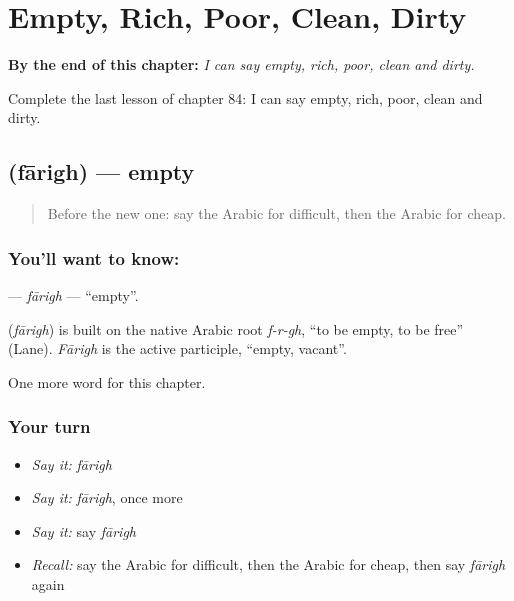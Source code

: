 
\chapter{Empty, Rich, Poor, Clean, Dirty}
\label{ch:ar-empty-rich-poor-clean-dirty}

\begin{chapteropening}
\textbf{By the end of this chapter:} \emph{I can say empty, rich, poor, clean and dirty.}

Complete the last lesson of chapter 84: I can say empty, rich, poor, clean and dirty.
\end{chapteropening}

\section[\texorpdfstring{\ar{فارغ} (fārigh)}{فارغ (fārigh)}]{ (fārigh) — empty}

\label{lesson:AR-C84-farigh}



\begin{quote}
Before the new one: say the Arabic for difficult, then the Arabic for cheap.
\end{quote}

\subsection*{You'll want to know: }
\textbf{} — \emph{fārigh} — \textquotedblleft{}empty\textquotedblright{}.

\begin{cousinweb}
\textbf{} (\emph{fārigh}) is built on the native Arabic root \emph{f-r-gh}, \textquotedblleft{}to be empty, to be free\textquotedblright{} (Lane). \emph{Fārigh} is the active participle, \textquotedblleft{}empty, vacant\textquotedblright{}.
\end{cousinweb}

\begin{grammarlens}[title={What you've built}]
One more word for this chapter.
\end{grammarlens}

\subsection*{Your turn}
\begin{itemize}
\raggedright
  \item \emph{Say it:} \emph{fārigh}
  \item \emph{Say it:} \emph{fārigh}, once more
  \item \emph{Say it:} say \emph{fārigh}
  \item \emph{Recall:} say the Arabic for difficult, then the Arabic for cheap, then say \emph{fārigh} again
\end{itemize}

